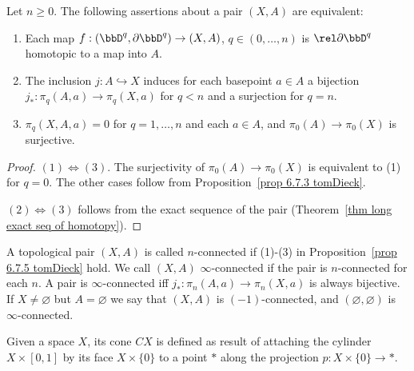 \begin{prop}\label{prop 6.7.5 tomDieck}
    Let $n\geq 0$. The following assertions about a pair $(X,A)$ are equivalent:
    \begin{enumerate}
        \item Each map $f:(\bbD^q,\partial \bbD^q)\to (X,A)$, $q\in (0,\ldots,n)$ is $\rel \partial \bbD^q$ homotopic to a map into $A$.
        \item The inclusion $j:A\hookrightarrow X$ induces for each basepoint $a\in A$ a bijection $j_\ast:\pi_q(A,a)\to \pi_q(X,a)$ for $q<n$ and a surjection for $q=n$.
        \item $\pi_q(X,A,a)=0$ for $q=1,\ldots,n$ and each $a\in A$, and $\pi_0(A)\to \pi_0(X)$ is surjective.
    \end{enumerate}
\end{prop}
\begin{proof}
    $(1)\Leftrightarrow (3)$. The surjectivity of $\pi_0(A)\to \pi_0(X)$ is equivalent to (1) for $q=0$. The other cases follow from Proposition~\ref{prop 6.7.3 tomDieck}.

    $(2)\Leftrightarrow(3)$ follows from the exact sequence of the pair (Theorem~\ref{thm long exact seq of homotopy}).
\end{proof}


\begin{defn}
    A topological pair $(X,A)$ is called $n$-connected if (1)-(3) in Proposition~\ref{prop 6.7.5 tomDieck} hold. We call $(X,A)$ $\infty$-connected if the pair is $n$-connected for each $n$. A pair is $\infty$-connected iff $j_\ast:\pi_n(A,a)\to \pi_n(X,a)$ is always bijective. If $X\neq\varnothing$ but $A=\varnothing$ we say that $(X,A)$ is $(-1)$-connected, and $(\varnothing,\varnothing)$ is $\infty$-connected.
\end{defn}

\begin{defn}[Cone]
    Given a space $X$, its cone $CX$ is defined as result of attaching the cylinder $X\times [0,1]$ by its face $X\times\{0\}$ to a point $*$ along the projection $p:X\times \{0\}\to *$.
\end{defn}


